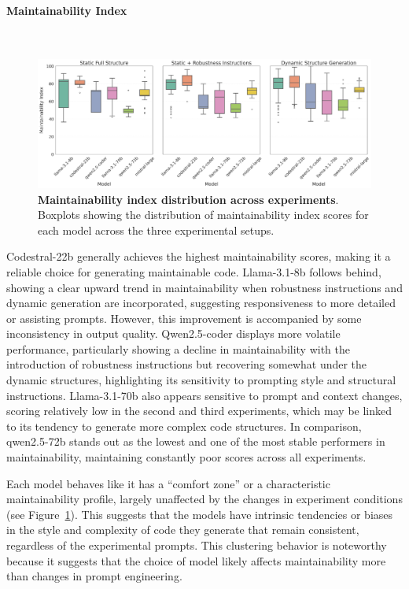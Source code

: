\documentclass{DESSThesis}
\begin{document}
\paragraph{Maintainability Index}\mbox{}\\

\begin{figure}[!b]
    \centering
    \includegraphics[width=\linewidth]{img/Results/First Experimental Phase/Maintainability Index per Model.png}
    \caption[Maintainability index distribution across experiments]{\textbf{Maintainability index distribution across experiments}. Boxplots showing the distribution of maintainability index scores for each model across the three experimental setups.}
    \label{fig:MI_distribution}
\end{figure}

\noindent Codestral-22b generally achieves the highest maintainability scores, making it a reliable choice for generating maintainable code. Llama-3.1-8b follows behind, showing a clear upward trend in maintainability when robustness instructions and dynamic generation are incorporated, suggesting responsiveness to more detailed or assisting prompts. However, this improvement is accompanied by some inconsistency in output quality. Qwen2.5-coder displays more volatile performance, particularly showing a decline in maintainability with the introduction of robustness instructions but recovering somewhat under the dynamic structures, highlighting its sensitivity to prompting style and structural instructions. Llama-3.1-70b also appears sensitive to prompt and context changes, scoring relatively low in the second and third experiments, which may be linked to its tendency to generate more complex code structures. In comparison, qwen2.5-72b stands out as the lowest and one of the most stable performers in maintainability, maintaining constantly poor scores across all experiments. 

Each model behaves like it has a “comfort zone” or a characteristic maintainability profile, largely unaffected by the changes in experiment conditions (see Figure~\ref{fig:MI_distribution}). This suggests that the models have intrinsic tendencies or biases in the style and complexity of code they generate that remain consistent, regardless of the experimental prompts. This clustering behavior is noteworthy because it suggests that the choice of model likely affects maintainability more than changes in prompt engineering.
\end{document}
